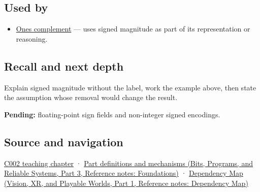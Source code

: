 \subsection{Used by}\label{appendix-ce20506c8532-used-by}

\hypertarget{appendix-ce20506c8532-used-by}{}

\begin{itemize}
\tightlist
\item
  \hyperref[appendix-03c678cd40b3]{One\textquotesingle s complement} --- uses signed magnitude as part of its representation or reasoning.
\end{itemize}

\subsection{Recall and next depth}\label{appendix-ce20506c8532-recall-and-next-depth}

\hypertarget{appendix-ce20506c8532-recall-and-next-depth}{}

Explain signed magnitude without the label, work the example above, then state the assumption whose removal would change the result.

\textbf{Pending:} floating-point sign fields and non-integer signed encodings.

\subsection{Source and navigation}\label{appendix-ce20506c8532-source-and-navigation}

\hypertarget{appendix-ce20506c8532-source-and-navigation}{}

\hyperref[01-foundations-i-ch001-arithmetic-becomes-a-policy]{C002 teaching chapter} · \href{../01-Bits-Programs-and-Reliable-Systems-P03/main.pdf\#appendix-fd090d982a15}{Part definitions and mechanisms (Bits, Programs, and Reliable Systems, Part 3, Reference notes: Foundations)} · \href{../07-Vision-XR-and-Playable-Worlds-P01/main.pdf\#appendix-4ad47bdd269a}{Dependency Map (Vision, XR, and Playable Worlds, Part 1, Reference notes: Dependency Map)}
